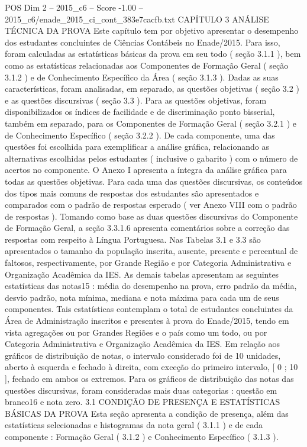 \begin{textsample}{POS Dim 2 – 2015\_c6 – Score -1.00 – 2015\_c6/enade\_2015\_ci\_cont\_383e7cacfb.txt}  \label{ex:f2_pos_240}
CAPÍTULO 3 ANÁLISE TÉCNICA DA PROVA Este capítulo tem por objetivo apresentar o desempenho dos estudantes concluintes de Ciências Contábeis no Enade/2015.
Para isso, foram calculadas as estatísticas básicas da prova em seu todo ( seção 3.1.1 ), bem como as estatísticas relacionadas aos Componentes de Formação Geral ( seção 3.1.2 ) e de Conhecimento Específico da Área ( seção 3.1.3 ).
Dadas as suas características, foram analisadas, em separado, as questões objetivas ( seção 3.2 ) e as questões discursivas ( seção 3.3 ).
Para as questões objetivas, foram disponibilizados os índices de facilidade e de discriminação ponto bisserial, também em separado, para os Componentes de Formação Geral ( seção 3.2.1 ) e de Conhecimento Específico ( seção 3.2.2 ).
De cada componente, uma das questões foi escolhida para exemplificar a análise gráfica, relacionando as alternativas escolhidas pelos estudantes ( inclusive o gabarito ) com o número de acertos no componente.
O Anexo I apresenta a íntegra da análise gráfica para todas as questões objetivas.
Para cada uma das questões discursivas, os conteúdos dos tipos mais comuns de respostas dos estudantes são apresentados e comparados com o padrão de respostas esperado ( ver Anexo VIII com o padrão de respostas ).
Tomando como base as duas questões discursivas do Componente de Formação Geral, a seção 3.3.1.6 apresenta comentários sobre a correção das respostas com respeito à Língua Portuguesa.
Nas Tabelas 3.1 e 3.3 são apresentados o tamanho da população inscrita, ausente, presente e percentual de faltosos, respectivamente, por Grande Região e por Categoria Administrativa e Organização Acadêmica da IES.
As demais tabelas apresentam as seguintes estatísticas das notas15 : média do desempenho na prova, erro padrão da média, desvio padrão, nota mínima, mediana e nota máxima para cada um de seus componentes.
Tais estatísticas contemplam o total de estudantes concluintes da Área de Administração inscritos e presentes à prova do Enade/2015, tendo em vista agregações ou por Grandes Regiões e o país como um todo, ou por Categoria Administrativa e Organização Acadêmica da IES.
Em relação aos gráficos de distribuição de notas, o intervalo considerado foi de 10 unidades, aberto à esquerda e fechado à direita, com exceção do primeiro intervalo, [ 0 ; 10 ], fechado em ambos os extremos.
Para os gráficos de distribuição das notas das questões discursivas, foram consideradas mais duas categorias : questão em branco16 e nota zero. 3.1 CONDIÇÃO DE PRESENÇA E ESTATÍSTICAS BÁSICAS DA PROVA Esta seção apresenta a condição de presença, além das estatísticas selecionadas e histogramas da nota geral ( 3.1.1 ) e de cada componente : Formação Geral ( 3.1.2 ) e Conhecimento Específico ( 3.1.3 ).

\end{textsample}
